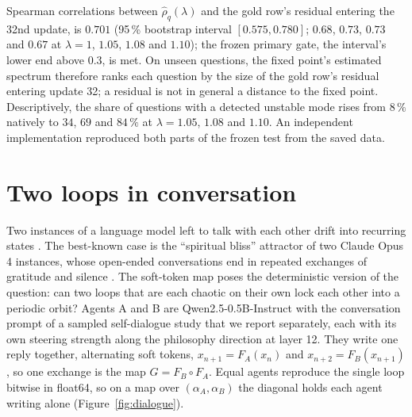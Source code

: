 \documentclass[11pt,letterpaper]{article}
\begin{document}
Spearman correlations between $\hat\rho_q(\lambda)$ and the gold row's residual entering the 32nd update, is $0.701$
(95\,\% bootstrap interval $[0.575,0.780]$; $0.68$, $0.73$, $0.73$ and $0.67$ at $\lambda=1$, $1.05$, $1.08$ and
$1.10$); the frozen primary gate, the interval's lower end above $0.3$, is met. On unseen questions, the fixed
point's estimated spectrum therefore ranks each question by the size of the gold row's residual entering update 32;
a residual is not in general a distance to the fixed point. Descriptively, the share of questions with a
detected unstable mode rises from $8\,\%$ natively to $34$, $69$ and $84\,\%$ at $\lambda=1.05$, $1.08$ and $1.10$.
An independent implementation reproduced both parts of the frozen test from the saved data.

\section{Two loops in conversation}
\label{sec:dialogue}
Two instances of a language model left to talk with each other drift into recurring states
\cite{ko2026attractor}. The best-known case is the ``spiritual bliss'' attractor of two Claude Opus 4 instances, whose
open-ended conversations end in repeated exchanges of gratitude and silence \cite{anthropic2025claude4}. The soft-token map poses the deterministic version of the
question: can two loops that are each chaotic on their own lock each other into a periodic orbit? Agents A and B are
Qwen2.5-0.5B-Instruct with the conversation prompt of a sampled self-dialogue study that we report separately,
each with its own steering strength along the
philosophy direction at layer 12. They write one reply together, alternating soft tokens, $x_{n+1}=F_A(x_n)$ and
$x_{n+2}=F_B(x_{n+1})$, so one exchange is the map $G=F_B\circ F_A$. Equal agents reproduce the single loop bitwise in
float64, so on a map over $(\alpha_A,\alpha_B)$ the diagonal holds each agent writing alone
(Figure~\ref{fig:dialogue}).
\end{document}
